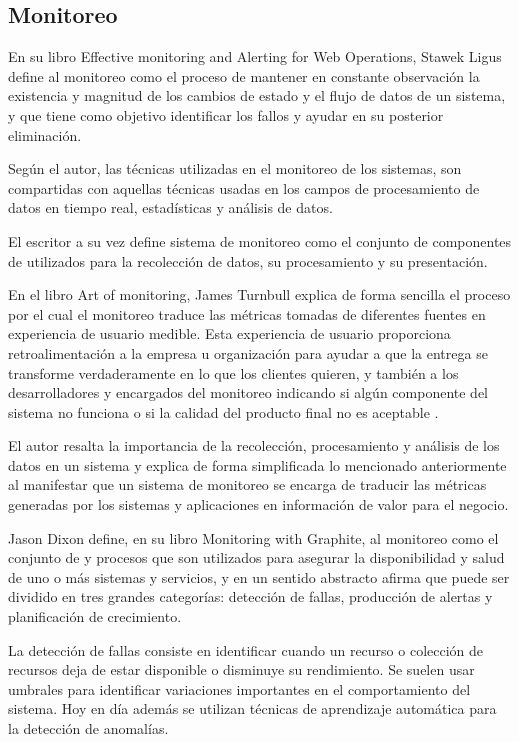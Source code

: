 \subsection{Monitoreo}
\label{monitoreo}

En su libro Effective monitoring and Alerting for Web Operations, Stawek Ligus
define al monitoreo como el proceso de mantener en constante observación la
existencia y magnitud de los cambios de estado y el flujo de datos de un
sistema, y que tiene como objetivo identificar los fallos y ayudar en su
posterior eliminación\cite[p.~2]{monitoreo:efective_monitoring_and_alerting}.

Según el autor, las técnicas utilizadas en el monitoreo de los sistemas, son
compartidas con aquellas técnicas usadas en los campos de procesamiento de
datos en tiempo real, estadísticas y análisis de datos.

El escritor a su vez define sistema de monitoreo como el conjunto de
componentes de  utilizados para la recolección de datos, su
procesamiento y su presentación.

En el libro Art of monitoring, James Turnbull explica de forma sencilla el
proceso por el cual el monitoreo traduce las métricas tomadas de diferentes
fuentes en experiencia de usuario medible. Esta experiencia de usuario
proporciona retroalimentación a la empresa u organización para ayudar a que la
entrega se transforme verdaderamente en lo que los clientes quieren, y también
a los desarrolladores y encargados del monitoreo indicando si algún componente
del sistema no funciona o si la calidad del producto final no es aceptable
\cite[p.~8]{monitoreo:art_of_monitoring}.

El autor resalta la importancia de la recolección, procesamiento y análisis de
los datos en un sistema y explica de forma simplificada lo mencionado
anteriormente al manifestar que un sistema de monitoreo se encarga de traducir
las métricas generadas por los sistemas y aplicaciones en información de valor
para el negocio.

Jason Dixon define, en su libro Monitoring with Graphite, al monitoreo como el
conjunto de  y procesos que son utilizados para asegurar la
disponibilidad y salud de uno o más sistemas y servicios, y en un sentido
abstracto afirma que puede ser dividido en tres grandes categorías: detección
de fallas, producción de alertas y planificación de crecimiento.

La detección de fallas consiste en identificar cuando un recurso o colección de
recursos deja de estar disponible o disminuye su rendimiento. Se suelen usar
umbrales para identificar variaciones importantes en el comportamiento del
sistema. Hoy en día además se utilizan técnicas de aprendizaje automática para
la detección de anomalías.

